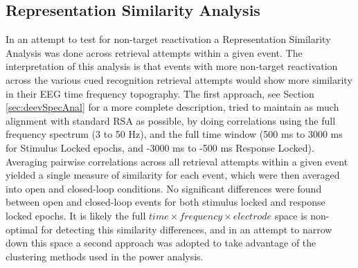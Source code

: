 \documentclass[11pt, titlepage, twoside]{article}
\begin{document}
\subsection{Representation Similarity Analysis}
In an attempt to test for non-target reactivation a Representation Similarity Analysis was done across retrieval attempts within a given event.  The interpretation of this analysis is that events with more non-target reactivation across the various cued recognition retrieval attempts would show more similarity in their EEG time frequency topography.  The first approach, see Section \ref{sec:deevSpecAnal} for a more complete description, tried to maintain as much alignment with standard RSA as possible, by doing correlations using the full frequency spectrum (3 to 50 Hz), and the full time window (500 ms to 3000 ms for Stimulus Locked epochs, and -3000 ms to -500 ms Response Locked).  Averaging pairwise correlations across all retrieval attempts within a given event yielded a single measure of similarity for each event, which were then averaged into open and closed-loop conditions. No significant differences were found between open and closed-loop events for both stimulus locked and response locked epochs.  It is likely the full $time \times frequency \times electrode$ space is non-optimal for detecting this similarity differences, and in an attempt to narrow down this space a second approach was adopted to take advantage of the clustering methods used in the power analysis.
\end{document}

